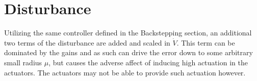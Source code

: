 \documentclass{article}
\begin{document}
\section{Disturbance}
Utilizing the same controller defined in the Backstepping section, an additional two terms of the disturbance are added and scaled in $\dot{V}$. This term can be dominated by the gains and as such can drive the error down to some arbitrary small radius $\mu$, but causes the adverse affect of inducing high actuation in the actuators. The actuators may not be able to provide such actuation however.
\end{document}
